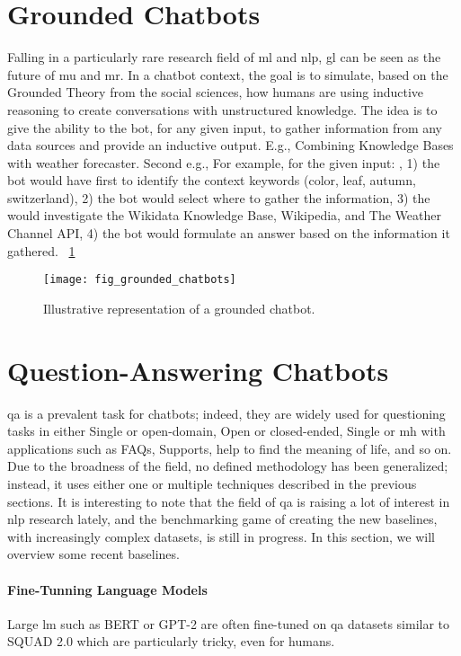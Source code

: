 \section{Grounded Chatbots}
\label{chatbot:grounded}
Falling in a particularly rare research field of \gls{ml} and \gls{nlp}, \gls{gl} can be seen as the future of \gls{mu} and \gls{mr}. In a chatbot context, the goal is to simulate, based on the Grounded Theory from the social sciences, how humans are using inductive reasoning to create conversations with unstructured knowledge. The idea is to give the ability to the bot, for any given input, to gather information from any data sources and provide an inductive output. E.g., Combining Knowledge Bases with weather forecaster. Second e.g., For example, for the given input: , 1) the bot would have first to identify the context keywords (color, leaf, autumn, switzerland), 2) the bot would select where to gather the information, 3) the would investigate the Wikidata Knowledge Base, Wikipedia, and The Weather Channel API, 4) the bot would formulate an answer based on the information it gathered. ~\ref{fig:fig_grounded_chatbots}

\begin{figure}[H]
    \centering
    \texttt{[image: fig\_grounded\_chatbots]}
    \caption{Illustrative representation of a grounded chatbot.}
    \label{fig:fig_grounded_chatbots}
\end{figure}

\section{Question-Answering Chatbots}
\gls{qa} is a prevalent task for chatbots; indeed, they are widely used for questioning tasks in either Single or \gls{open-domain}, Open or \gls{closed-ended}, Single or \gls{mh} with applications such as FAQs, Supports, help to find the meaning of life, and so on. Due to the broadness of the field, no defined methodology has been generalized; instead, it uses either one or multiple techniques described in the previous sections. It is interesting to note that the field of \gls{qa} is raising a lot of interest in \gls{nlp} research lately, and the benchmarking game of creating the new baselines, with increasingly complex datasets, is still in progress. In this section, we will overview some recent baselines.

\paragraph{Fine-Tunning Language Models} Large \gls{lm} such as BERT \autocite{paper:devlin-etal-2019-bert} or GPT-2 \autocite{papers:gpt2} are often fine-tuned on \gls{qa} datasets similar to SQUAD 2.0 \autocite{paper:rajpurkar-etal-2018-know} which are particularly tricky, even for humans.

